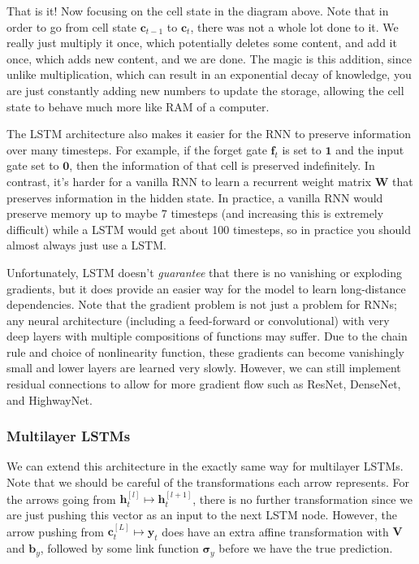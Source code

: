 \documentclass{article}
\begin{document}
  That is it! Now focusing on the cell state in the diagram above. Note that in order to go from cell state $\mathbf{c}_{t-1}$ to $\mathbf{c}_t$, there was not a whole lot done to it. We really just multiply it once, which potentially deletes some content, and add it once, which adds new content, and we are done. The magic is this addition, since unlike multiplication, which can result in an exponential decay of knowledge, you are just constantly adding new numbers to update the storage, allowing the cell state to behave much more like RAM of a computer. 

  The LSTM architecture also makes it easier for the RNN to preserve information over many timesteps. For example, if the forget gate $\mathbf{f}_t$ is set to $\mathbf{1}$ and the input gate set to $\mathbf{0}$, then the information of that cell is preserved indefinitely. In contrast, it's harder for a vanilla RNN to learn a recurrent weight matrix $\mathbf{W}$ that preserves information in the hidden state. In practice, a vanilla RNN would preserve memory up to maybe 7 timesteps (and increasing this is extremely difficult) while a LSTM would get about 100 timesteps, so in practice you should almost always just use a LSTM. 

  Unfortunately, LSTM doesn't \textit{guarantee} that there is no vanishing or exploding gradients, but it does provide an easier way for the model to learn long-distance dependencies. Note that the gradient problem is not just a problem for RNNs; any neural architecture (including a feed-forward or convolutional) with very deep layers with multiple compositions of functions may suffer. Due to the chain rule and choice of nonlinearity function, these gradients can become vanishingly small and lower layers are learned very slowly. However, we can still implement residual connections to allow for more gradient flow such as ResNet, DenseNet, and HighwayNet. 

  \subsubsection{Multilayer LSTMs}

    We can extend this architecture in the exactly same way for multilayer LSTMs. Note that we should be careful of the transformations each arrow represents. For the arrows going from $\mathbf{h}_{t}^{[l]} \mapsto \mathbf{h}_{t}^{[l+1]}$, there is no further transformation since we are just pushing this vector as an input to the next LSTM node. However, the arrow pushing from $\mathbf{c}_t^{[L]} \mapsto \hat{\mathbf{y}}_{t}$ does have an extra affine transformation with $\mathbf{V}$ and $\mathbf{b}_y$, followed by some link function $\boldsymbol{\sigma}_y$ before we have the true prediction.  
\end{document}
